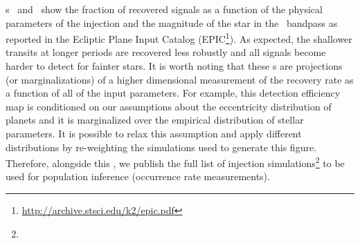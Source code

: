 \figurename s~ and~ show the
fraction of recovered signals as a function of the physical parameters of the
injection and the magnitude of the star in the \kepler\ bandpass as reported
in the Ecliptic Plane Input Catalog
(EPIC\footnote{\url{http://archive.stsci.edu/k2/epic.pdf}}).
As expected, the shallower transits at longer periods are recovered less
robustly and all signals become harder to detect for fainter stars.
It is worth noting that these \figurename s are projections (or
marginalizations) of a higher dimensional measurement of the recovery rate as
a function of all of the input parameters.
For example, this detection efficiency map is conditioned on our assumptions
about the eccentricity distribution of planets and it is marginalized over the
empirical distribution of stellar parameters.
It is possible to relax this assumption and apply different distributions by
re-weighting the simulations used to generate this figure.
Therefore, alongside this \paper, we publish the full list of injection
simulations\footnote{\datareleaseurl} to be used for population inference
(occurrence rate measurements).



